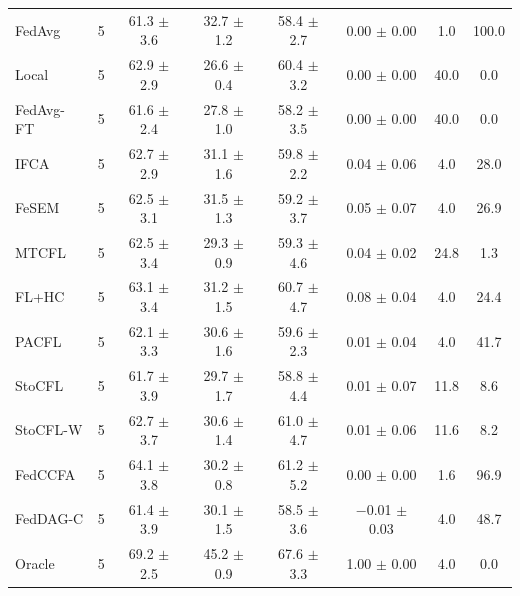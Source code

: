 {{\begin{tabular}{l r c c c c c c}
FedAvg & 5 & 61.3 $\pm$ 3.6 & 32.7 $\pm$ 1.2 & 58.4 $\pm$ 2.7 & 0.00 $\pm$ 0.00 & 1.0 & 100.0 \\
Local & 5 & 62.9 $\pm$ 2.9 & 26.6 $\pm$ 0.4 & 60.4 $\pm$ 3.2 & 0.00 $\pm$ 0.00 & 40.0 & 0.0 \\
FedAvg-FT & 5 & 61.6 $\pm$ 2.4 & 27.8 $\pm$ 1.0 & 58.2 $\pm$ 3.5 & 0.00 $\pm$ 0.00 & 40.0 & 0.0 \\
IFCA & 5 & 62.7 $\pm$ 2.9 & 31.1 $\pm$ 1.6 & 59.8 $\pm$ 2.2 & 0.04 $\pm$ 0.06 & 4.0 & 28.0 \\
FeSEM & 5 & 62.5 $\pm$ 3.1 & 31.5 $\pm$ 1.3 & 59.2 $\pm$ 3.7 & 0.05 $\pm$ 0.07 & 4.0 & 26.9 \\
MTCFL & 5 & 62.5 $\pm$ 3.4 & 29.3 $\pm$ 0.9 & 59.3 $\pm$ 4.6 & 0.04 $\pm$ 0.02 & 24.8 & 1.3 \\
FL+HC & 5 & 63.1 $\pm$ 3.4 & 31.2 $\pm$ 1.5 & 60.7 $\pm$ 4.7 & 0.08 $\pm$ 0.04 & 4.0 & 24.4 \\
PACFL & 5 & 62.1 $\pm$ 3.3 & 30.6 $\pm$ 1.6 & 59.6 $\pm$ 2.3 & 0.01 $\pm$ 0.04 & 4.0 & 41.7 \\
StoCFL & 5 & 61.7 $\pm$ 3.9 & 29.7 $\pm$ 1.7 & 58.8 $\pm$ 4.4 & 0.01 $\pm$ 0.07 & 11.8 & 8.6 \\
StoCFL-W & 5 & 62.7 $\pm$ 3.7 & 30.6 $\pm$ 1.4 & 61.0 $\pm$ 4.7 & 0.01 $\pm$ 0.06 & 11.6 & 8.2 \\
FedCCFA & 5 & 64.1 $\pm$ 3.8 & 30.2 $\pm$ 0.8 & 61.2 $\pm$ 5.2 & 0.00 $\pm$ 0.00 & 1.6 & 96.9 \\
FedDAG-C & 5 & 61.4 $\pm$ 3.9 & 30.1 $\pm$ 1.5 & 58.5 $\pm$ 3.6 & $-$0.01 $\pm$ 0.03 & 4.0 & 48.7 \\
Oracle & 5 & 69.2 $\pm$ 2.5 & 45.2 $\pm$ 0.9 & 67.6 $\pm$ 3.3 & 1.00 $\pm$ 0.00 & 4.0 & 0.0 \\
\bottomrule
\end{tabular}}
}

